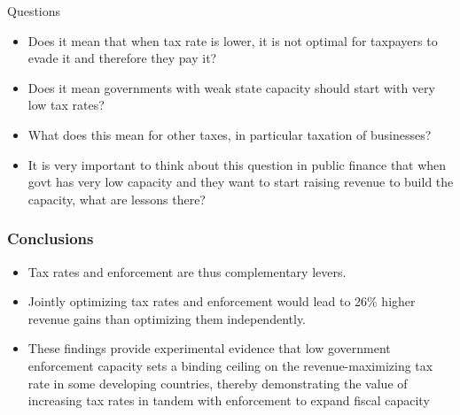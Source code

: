 \documentclass{beamer}
\begin{document}
\begin{frame}{Questions}
    \begin{itemize}
        \item Does it mean that when tax rate is lower, it is not optimal for taxpayers to evade it and therefore they pay it?
        \item Does it mean governments with weak state capacity should start with very low tax rates?
        \item What does this mean for other taxes, in particular taxation of businesses?
        \item It is very important to think about this question in public finance that when govt has very low capacity and they want to start raising revenue to build the capacity, what are lessons there?
    \end{itemize}
\end{frame}
\begin{frame}
\frametitle{Conclusions}
\begin{itemize}
\item Tax rates and enforcement are thus complementary levers. 
\item Jointly optimizing tax rates and
enforcement would lead to 26\% higher revenue gains than optimizing them independently.
\item These
findings provide experimental evidence that low government enforcement capacity sets a binding
ceiling on the revenue-maximizing tax rate in some developing countries, thereby demonstrating
the value of increasing tax rates in tandem with enforcement to expand fiscal capacity
\end{itemize}
\end{frame}
\end{document}
